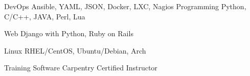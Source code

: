 

\begin{cvskills}

  \cvskill
    {DevOps} %
    {Ansible, YAML, JSON, Docker, LXC, Nagios}
  \cvskill
    {Programming} %
    {Python, C/C++, JAVA, Perl, Lua} %

  \cvskill
    {Web} %
    {Django with Python, Ruby on Rails} %

  \cvskill
    {Linux} %
    {RHEL/CentOS, Ubuntu/Debian, Arch} %

  \cvskill
    {Training} %
    {Software Carpentry Certified Instructor} %

\end{cvskills}
